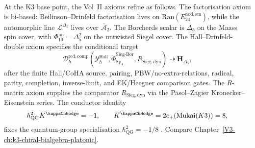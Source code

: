 \begin{remark}
\label{rem:axioms-2}
At the K3 base point, the Vol~II axioms refine as follows. The
factorisation axiom is bi-based: Beilinson--Drinfeld factorisation
lives on $\mathrm{Ran}(E^{\mathrm{nod,sm}}_{24})$, while the
automorphic line $\mathcal L^{\Delta_5}$ lives over
$\bar{\mathcal A}_2$. The Borcherds scalar is
$\Delta_5$ on the Maass spin cover, with
$\Phi_{10}^{\mathrm{un}}=\Delta_5^2$ on the untwisted Siegel
cover. The Hall--Drinfeld-double axiom specifies the conditional
target
\[
\mathcal D_\hbar^{\mathrm{red},\mathrm{comp}}(
  \mathcal Y^{\mathrm{Hall}}_\hbar,
  \widetilde\Phi^{\mathrm{Sieg\text{-}Bor}}_{\mathrm{Sp}_4},
  R_{\mathrm{Sieg,dyn}})
\;\dashrightarrow\;
\mathbf H_{\Delta_5},
\]
after the finite Hall/CoHA source, pairing, PBW/no-extra-relations,
radical, parity, completion, inverse-limit, and EK/Heegner comparison
gates. The $R$-matrix axiom supplies the comparator
$R_{\mathrm{Sieg,dyn}}$ via the Pasol--Zagier
Kronecker--Eisenstein series. The conductor identity
\[
\hbar_{\mathrm{QG}}^2 K^{\kappaChHodge}=-1,\qquad
K^{\kappaChHodge}=2c_+(\mathrm{Mukai}(K3))=8,
\]
fixes the quantum-group specialisation
$\hbar_{\mathrm{QG}}^2=-1/8$ \cite{PasolZagier2013,EtingofKazhdan2007PartV}.
Compare Chapter~\ref{V3-ch:k3-chiral-bialgebra-platonic}.
\end{remark}
